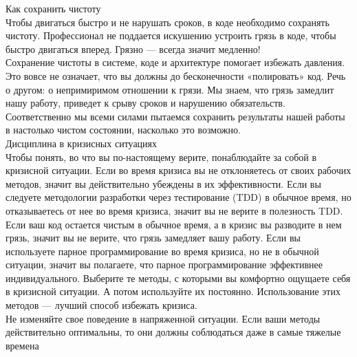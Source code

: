 \documentclass{../industrial-development}
\begin{document}
Как сохранить чистоту\\
Чтобы двигаться быстро и не нарушать сроков, в коде необходимо сохранять чистоту. Профессионал не поддается искушению устроить грязь в коде, чтобы быстро двигаться вперед. Грязно — всегда значит медленно!\\
Сохранение чистоты в системе, коде и архитектуре помогает избежать давления. Это вовсе не означает, что вы должны до бесконечности «полировать» код. Речь о другом: о непримиримом отношении к грязи. Мы знаем, что грязь замедлит нашу работу, приведет к срыву сроков и нарушению обязательств. Соответственно мы всеми силами пытаемся сохранить результаты нашей работы в настолько чистом состоянии, насколько это возможно.\\
Дисциплина в кризисных ситуациях\\
Чтобы понять, во что вы по-настоящему верите, понаблюдайте за собой в кризисной ситуации. Если во время кризиса вы не отклоняетесь от своих рабочих методов, значит вы действительно убеждены в их эффективности. Если вы следуете методологии разработки через тестирование (TDD) в обычное время, но отказываетесь от нее во время кризиса, значит вы не верите в полезность TDD. Если ваш код остается чистым в обычное время, а в кризис вы разводите в нем грязь, значит вы не верите, что грязь замедляет вашу работу. Если вы используете парное программирование во время кризиса, но не в обычной ситуации, значит вы полагаете, что парное программирование эффективнее индивидуального. Выберите те методы, с которыми вы комфортно ощущаете себя в кризисной ситуации. А потом используйте их постоянно. Использование этих методов — лучший способ избежать кризиса.\\
Не изменяйте свое поведение в напряженной ситуации. Если ваши методы действительно оптимальны, то они должны соблюдаться даже в самые тяжелые времена
\end{document}
